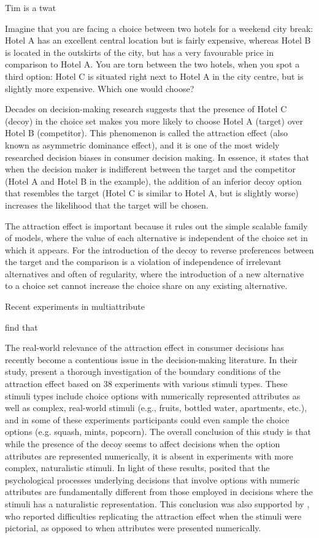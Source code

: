 \documentclass[12pt, a4paper]{article}
\begin{document}
Tim is a twat

Imagine that you are facing a choice between two hotels for a weekend city break: Hotel A has an excellent central location but is fairly expensive, whereas Hotel B is located in the outskirts of the city, but has a very favourable price in comparison to Hotel A. You are torn between the two hotels, when you spot a third option: Hotel C is situated right next to Hotel A in the city centre, but is slightly more expensive. Which one would choose?

Decades on decision-making research suggests that the presence of Hotel C (decoy) in the choice set makes you more likely to choose Hotel A (target) over Hotel B (competitor). This phenomenon is called the attraction effect (also known as asymmetric dominance effect), and it is one of the most widely researched decision biases in consumer decision making. In essence, it states that when the decision maker is indifferent between the target and the competitor (Hotel A and Hotel B in the example), the addition of an inferior decoy option that resembles the target (Hotel C is similar to Hotel A, but is slightly worse) increases the likelihood that the target will be chosen.


The attraction effect is important because it rules out the simple scalable family of models, where the value of each alternative is independent of the choice set in which it appears. For the introduction of the decoy to reverse preferences between the target and the comparison is a violation of independence of irrelevant alternatives and often of regularity, where the introduction of a new alternative to a choice set cannot increase the choice share on any existing alternative. 

Recent experiments in multiattribute 

 find that 


The real-world relevance of the attraction effect in consumer decisions has recently become a contentious issue in the decision-making literature. In their study,  present a thorough investigation of the boundary conditions of the attraction effect based on 38 experiments with various stimuli types. These stimuli types include choice options with numerically represented attributes as well as complex, real-world stimuli (e.g., fruits, bottled water, apartments, etc.), and  in some of these experiments participants could even sample the choice options (e.g. squash, mints, popcorn). The overall conclusion of this study is that while the presence of the decoy seems to affect decisions when the option attributes are represented numerically, it is absent in experiments with more complex, naturalistic stimuli. In light of these results, \citeauthor{Frederick2014} posited that the psychological processes underlying decisions that involve options with numeric attributes are fundamentally different from those employed in decisions where the stimuli has a naturalistic representation. This conclusion was also supported by , who reported difficulties replicating the attraction effect when the stimuli were pictorial, as opposed to when attributes were presented numerically.
\end{document}
